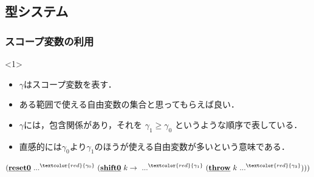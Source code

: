 \documentclass[dvipdfmx,cjk,xcolor=dvipsnames,envcountsect,notheorems,12pt]{beamer}
\newcommand\cResetz{\underline{\textbf{reset0}}}
\newcommand\cShiftz{\underline{\textbf{shift0}}}
\newcommand\cThrow{\underline{\textbf{throw}}}
\newcommand\ord{\ge}
\newcommand\red[1]{\textcolor{red}{#1}}
\theoremstyle{definition}
\begin{document}
\subsection{型システム}
\begin{frame}
  \frametitle{スコープ変数の利用}

  \begin{onlyenv}<1>
    \begin{itemize}
    \item $\gamma$はスコープ変数を表す．
    \item ある範囲で使える\alert{自由変数の集合}と思ってもらえば良い．
    \item $\gamma$には，包含関係があり，それを $\gamma_1 \ord \gamma_0$ というような順序で表している．
    \item 直感的には$\gamma_0$より$\gamma_1$のほうが使える自由変数が多いという意味である．
    \end{itemize}

    \begin{align*}
      (\cResetz ~...^{\red{\gamma_0}}~ (\cShiftz ~k \to ~...^{\red{\gamma_1}}~ (\cThrow ~k ~...^{\red{\gamma_3}})))
    \end{align*}
  \end{onlyenv}
\end{frame}
\end{document}
